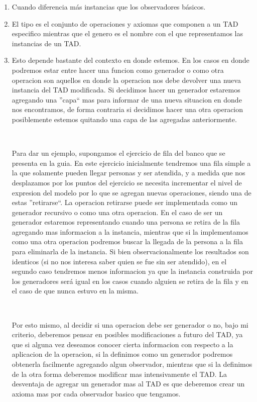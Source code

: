 \documentclass[10pt, a4paper]{report}
\begin{document}
\begin{enumerate}
 \item Cuando diferencia m\'as instancias que los observadores b\'asicos.
 \item El tipo es el conjunto de operaciones y axiomas que componen a un TAD especifico mientras que el genero es el nombre con el que representamos las instancias de un TAD.
 \item Esto depende bastante del contexto en donde estemos. En los casos en donde podremos estar entre hacer una funcion como generador o como otra operacion son aquellos en donde la operacion nos debe devolver una nueva instancia del TAD modificada. Si decidimos hacer un generador estaremos agregando una ''capa`` mas para informar de una nueva situacion en donde nos encontramos, de forma contraria si decidimos hacer una otra operacion posiblemente estemos quitando una capa de las agregadas anteriormente. 
 
 ~
 
 Para dar un ejemplo, supongamos el ejercicio de fila del banco que se presenta en la guia. En este ejercicio inicialmente tendremos una fila simple a la que solamente pueden llegar personas y ser atendida, y a medida que nos desplazamos por los puntos del ejercicio se necesita incrementar el nivel de expresion del modelo por lo que se agregan nuevas operaciones, siendo una de estas ''retirarse``. La operacion retirarse puede ser implementada como un generador recursivo o como una otra operacion. En el caso de ser un generador estaremos representando cuando una persona se retira de la fila agregando mas informacion a la instancia, mientras que si la implementamos como una otra operacion podremos buscar la llegada de la persona a la fila para eliminarla de la instancia. Si bien observacionalmente los resultados son identicos (si no nos interesa saber quien se fue sin ser atendido), en el segundo caso tendremos menos informacion ya que la instancia construida por los generadores ser\'a igual en los casos 
cuando alguien se retira de la fila y en el caso de que nunca estuvo en la misma.
 
 ~
 
 Por esto mismo, al decidir si una operacion debe ser generador o no, bajo mi criterio, deberemos pensar en posibles modificaciones a futuro del TAD, ya que si alguna vez deseamos conocer cierta informacion con respecto a la aplicacion de la operacion, si la definimos como un generador podremos obtenerla facilmente agregando algun observador, mientras que si la definimos de la otra forma deberemos modificar mas intensivamente el TAD. La desventaja de agregar un generador mas al TAD es que deberemos crear un axioma mas por cada observador basico que tengamos. 
\end{enumerate}
\end{document}
